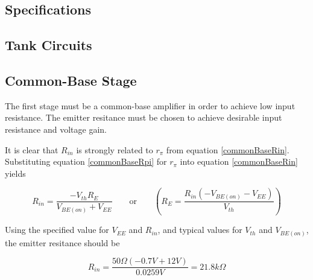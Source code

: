 \documentclass[titlepage, letterpaper, 11pt]{article}
\begin{document}
\subsection{Specifications}

\subsection{Tank Circuits}

\subsection{Common-Base Stage}

The first stage must be a common-base amplifier in order to achieve
low input resistance. The emitter resitance must be
chosen to achieve desirable input resistance and voltage gain.

It is clear that $R_{in}$ is strongly related to $r_{\pi}$ from
equation \ref{commonBaseRin}. Substituting equation
\ref{commonBaseRpi} for $r_{\pi}$ into equation \ref{commonBaseRin}
yields

\begin{equation*}
R_{in}=\frac{-V_{th}R_{E}}{V_{BE(on)}+V_{EE}}
\qquad\textrm{or}\qquad
\left(R_{E}=\frac{R_{in}(-V_{BE(on)}-V_{EE})}{V_{th}}\right)
\end{equation*}

Using the specified value for $V_{EE}$ and $R_{in}$, and typical
values for $V_{th}$ and $V_{BE(on)}$, the emitter resitance should be

\begin{equation*}
R_{in}=\frac{50\Omega(-0.7V+12V)}{0.0259V}=21.8k\Omega
\end{equation*}
\end{document}
